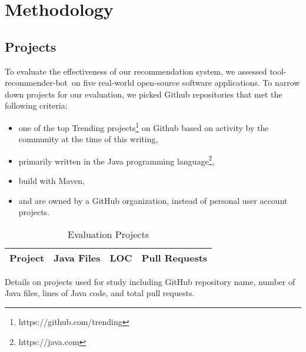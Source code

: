 \documentclass[conference]{IEEEtran}
\newcommand{\tool}{tool-recommender-bot}
\begin{document}
\section{Methodology}

\subsection{Projects}

To evaluate the effectiveness of our recommendation system, we assessed \tool~on five real-world open-source software applications. To narrow down projects for our evaluation, we picked Github repositories that met the following criteria:

\begin{itemize}
\item one of the top Trending projects\footnote{https://github.com/trending} on Github based on activity by the community at the time of this writing,
\item primarily written in the Java programming language\footnote{https://java.com},
\item build with Maven,
\item and are owned by a GitHub organization, instead of personal user account projects.
\end{itemize}

\begin{table}
	\centering
	\caption{Evaluation Projects}
	\begin{tabular}{|l|l|l|c|}
		\hline
		\textbf{Project} & \textbf{Java Files} & \textbf{LOC} & \textbf{Pull Requests} \\
		\hline
		\end{tabular}
	\begin{tablenotes}
        \item[1] Details on projects used for study including GitHub repository name, number of Java files, lines of Java code, and total pull requests.
    \end{tablenotes}
	\label{tools}
\end{table}
\end{document}
